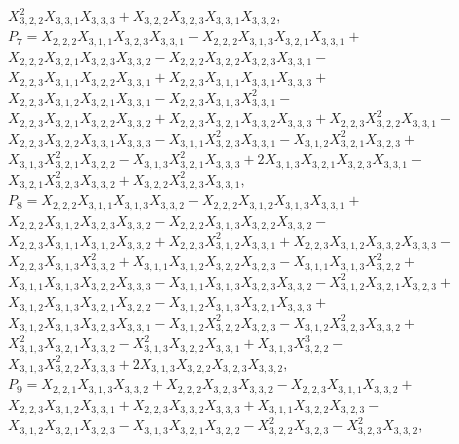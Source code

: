 \documentclass[10pt]{beamer}
\begin{document}
$X_{3,2,2}^2X_{3,3,1}X_{3,3,3}+X_{3,2,2}X_{3,2,3}X_{3,3,1}X_{3,3,2},$\\
$P_{7}=X_{2,2,2}X_{3,1,1}X_{3,2,3}X_{3,3,1}-X_{2,2,2}X_{3,1,3}X_{3,2,1}X_{3,3,1}+$\\
$X_{2,2,2}X_{3,2,1}X_{3,2,3}X_{3,3,2}-X_{2,2,2}X_{3,2,2}X_{3,2,3}X_{3,3,1}-$\\
$X_{2,2,3}X_{3,1,1}X_{3,2,2}X_{3,3,1}+X_{2,2,3}X_{3,1,1}X_{3,3,1}X_{3,3,3}+$\\
$X_{2,2,3}X_{3,1,2}X_{3,2,1}X_{3,3,1}-X_{2,2,3}X_{3,1,3}X_{3,3,1}^2-$\\
$X_{2,2,3}X_{3,2,1}X_{3,2,2}X_{3,3,2}+X_{2,2,3}X_{3,2,1}X_{3,3,2}X_{3,3,3}+X_{2,2,3}X_{3,2,2}^2X_{3,3,1}-$\\
$X_{2,2,3}X_{3,2,2}X_{3,3,1}X_{3,3,3}-X_{3,1,1}X_{3,2,3}^2X_{3,3,1}-X_{3,1,2}X_{3,2,1}^2X_{3,2,3}+$\\
$X_{3,1,3}X_{3,2,1}^2X_{3,2,2}-X_{3,1,3}X_{3,2,1}^2X_{3,3,3}+2X_{3,1,3}X_{3,2,1}X_{3,2,3}X_{3,3,1}-$\\
$X_{3,2,1}X_{3,2,3}^2X_{3,3,2}+X_{3,2,2}X_{3,2,3}^2X_{3,3,1},$\\
$P_{8}=X_{2,2,2}X_{3,1,1}X_{3,1,3}X_{3,3,2}-X_{2,2,2}X_{3,1,2}X_{3,1,3}X_{3,3,1}+$\\
$X_{2,2,2}X_{3,1,2}X_{3,2,3}X_{3,3,2}-X_{2,2,2}X_{3,1,3}X_{3,2,2}X_{3,3,2}-$\\
$X_{2,2,3}X_{3,1,1}X_{3,1,2}X_{3,3,2}+X_{2,2,3}X_{3,1,2}^2X_{3,3,1}+X_{2,2,3}X_{3,1,2}X_{3,3,2}X_{3,3,3}-$\\
$X_{2,2,3}X_{3,1,3}X_{3,3,2}^2+X_{3,1,1}X_{3,1,2}X_{3,2,2}X_{3,2,3}-X_{3,1,1}X_{3,1,3}X_{3,2,2}^2+$\\
$X_{3,1,1}X_{3,1,3}X_{3,2,2}X_{3,3,3}-X_{3,1,1}X_{3,1,3}X_{3,2,3}X_{3,3,2}-X_{3,1,2}^2X_{3,2,1}X_{3,2,3}+$\\
$X_{3,1,2}X_{3,1,3}X_{3,2,1}X_{3,2,2}-X_{3,1,2}X_{3,1,3}X_{3,2,1}X_{3,3,3}+$\\
$X_{3,1,2}X_{3,1,3}X_{3,2,3}X_{3,3,1}-X_{3,1,2}X_{3,2,2}^2X_{3,2,3}-X_{3,1,2}X_{3,2,3}^2X_{3,3,2}+$\\
$X_{3,1,3}^2X_{3,2,1}X_{3,3,2}-X_{3,1,3}^2X_{3,2,2}X_{3,3,1}+X_{3,1,3}X_{3,2,2}^3-$\\
$X_{3,1,3}X_{3,2,2}^2X_{3,3,3}+2X_{3,1,3}X_{3,2,2}X_{3,2,3}X_{3,3,2},$\\
$P_{9}=X_{2,2,1}X_{3,1,3}X_{3,3,2}+X_{2,2,2}X_{3,2,3}X_{3,3,2}-X_{2,2,3}X_{3,1,1}X_{3,3,2}+$\\
$X_{2,2,3}X_{3,1,2}X_{3,3,1}+X_{2,2,3}X_{3,3,2}X_{3,3,3}+X_{3,1,1}X_{3,2,2}X_{3,2,3}-$\\
$X_{3,1,2}X_{3,2,1}X_{3,2,3}-X_{3,1,3}X_{3,2,1}X_{3,2,2}-X_{3,2,2}^2X_{3,2,3}-X_{3,2,3}^2X_{3,3,2},$\\
\end{document}
